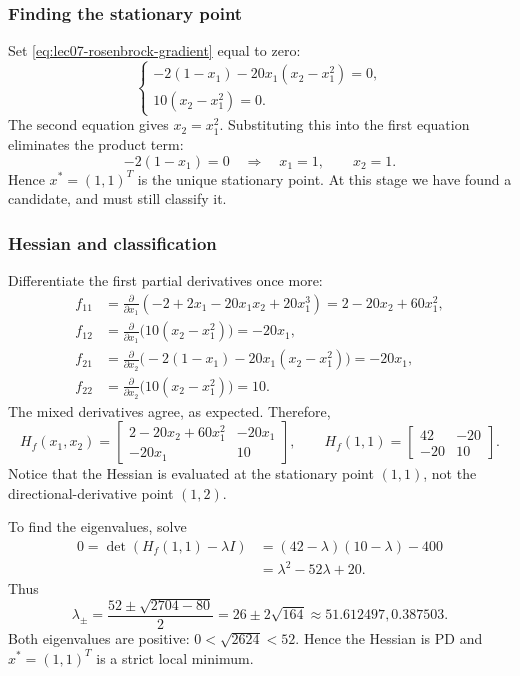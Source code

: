 \subsubsection*{Finding the stationary point}
Set \autoref{eq:lec07-rosenbrock-gradient} equal to zero:
\[
 \begin{cases}
 -2(1-x_1)-20x_1(x_2-x_1^2)=0,\\
 10(x_2-x_1^2)=0.
 \end{cases}
\]
The second equation gives $x_2=x_1^2$. Substituting this into the first equation eliminates the product term:
\[
 -2(1-x_1)=0\quad\Longrightarrow\quad x_1=1,
 \qquad x_2=1.
\]
Hence $x^*=(1,1)^T$ is the unique stationary point. At this stage we have found a candidate, and must still classify it.

\subsubsection*{Hessian and classification}
Differentiate the first partial derivatives once more:
\begin{align*}
 f_{11}&=\frac{\partial}{\partial x_1}
       (-2+2x_1-20x_1x_2+20x_1^3)
       =2-20x_2+60x_1^2,\\
 f_{12}&=\frac{\partial}{\partial x_1}\bigl(10(x_2-x_1^2)\bigr)
       =-20x_1,\\
 f_{21}&=\frac{\partial}{\partial x_2}
       \bigl(-2(1-x_1)-20x_1(x_2-x_1^2)\bigr)=-20x_1,\\
 f_{22}&=\frac{\partial}{\partial x_2}\bigl(10(x_2-x_1^2)\bigr)=10.
\end{align*}
The mixed derivatives agree, as expected. Therefore,
\begin{equation}
 H_f(x_1,x_2)=\begin{bmatrix}
 2-20x_2+60x_1^2&-20x_1\\-20x_1&10
 \end{bmatrix},
 \qquad H_f(1,1)=\begin{bmatrix}42&-20\\-20&10\end{bmatrix}.
 \label{eq:lec07-rosenbrock-hessian}
\end{equation}
Notice that the Hessian is evaluated at the stationary point $(1,1)$, not the directional-derivative point $(1,2)$.

To find the eigenvalues, solve
\begin{align*}
 0=\det(H_f(1,1)-\lambda I)
 &=(42-\lambda)(10-\lambda)-400\\
 &=\lambda^2-52\lambda+20.
\end{align*}
Thus
\begin{equation}
 \lambda_{\pm}=\frac{52\pm\sqrt{2704-80}}{2}
 =26\pm2\sqrt{164}
 \approx 51.612497,  0.387503.
 \label{eq:lec07-rosenbrock-eigenvalues}
\end{equation}
Both eigenvalues are positive: $0<\sqrt{2624}<52$. Hence the Hessian is PD and $x^*=(1,1)^T$ is a strict local minimum.

